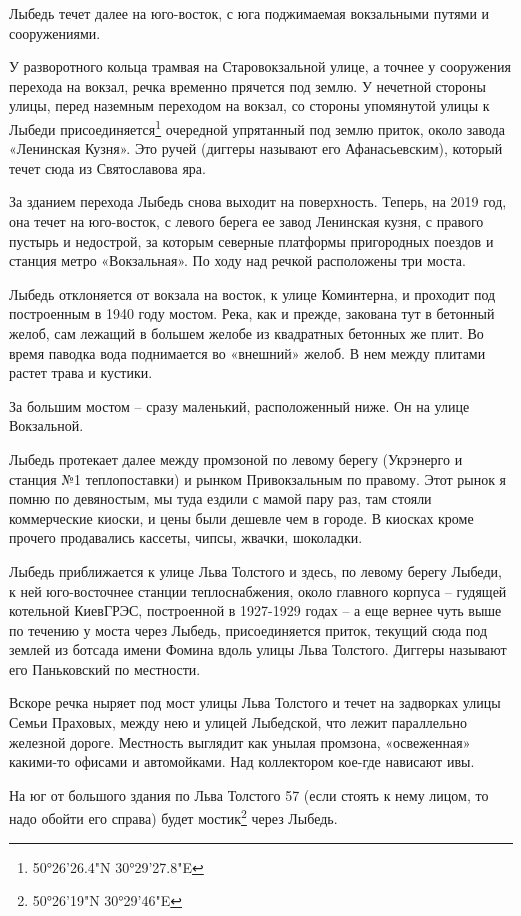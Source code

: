 Лыбедь течет далее на юго-восток, с юга поджимаемая вокзальными путями и сооружениями. 

У разворотного кольца трамвая на Старовокзальной улице, а точнее у сооружения перехода на вокзал, речка временно прячется под землю. У нечетной стороны улицы, перед наземным переходом на вокзал, со стороны упомянутой улицы к Лыбеди присоединяется\footnote{50°26'26.4"N 30°29'27.8"E} очередной упрятанный под землю приток, около завода «Ленинская Кузня». Это ручей (диггеры называют его Афанасьевским), который течет сюда из Святославова яра.

За зданием перехода Лыбедь снова выходит на поверхность. Теперь, на 2019 год, она течет на юго-восток, с левого берега ее завод Ленинская кузня, с правого пустырь и недострой, за которым северные платформы пригородных поездов и станция метро «Вокзальная». По ходу над речкой расположены три моста.

Лыбедь отклоняется от вокзала на восток, к улице Коминтерна, и проходит под построенным в 1940 году мостом. Река, как и прежде, закована тут в бетонный желоб, сам лежащий в большем желобе из квадратных бетонных же плит. Во время паводка вода поднимается во «внешний» желоб. В нем между плитами растет трава и кустики.

За большим мостом – сразу маленький, расположенный ниже. Он на улице Вокзальной.

Лыбедь протекает далее между промзоной по левому берегу (Укрэнерго и  станция №1 теплопоставки) и рынком Привокзальным по правому. Этот рынок я помню по девяностым, мы туда ездили с мамой пару раз, там стояли коммерческие киоски, и цены были дешевле чем в городе. В киосках кроме прочего продавались кассеты, чипсы, жвачки, шоколадки. 

Лыбедь приближается к улице Льва Толстого и здесь, по левому берегу Лыбеди, к ней юго-восточнее станции теплоснабжения, около главного корпуса – гудящей котельной КиевГРЭС, построенной в 1927-1929 годах – а еще вернее чуть выше по течению у моста через Лыбедь, присоединяется приток, текущий сюда под землей из ботсада имени Фомина вдоль улицы Льва Толстого. Диггеры называют его Паньковский по местности.

Вскоре речка ныряет под мост улицы Льва Толстого и течет на задворках улицы Семьи Праховых, между нею и улицей Лыбедской, что лежит параллельно железной дороге. Местность выглядит как унылая промзона, «освеженная» какими-то офисами и автомойками. Над коллектором кое-где нависают ивы.

На юг от большого здания по Льва Толстого 57 (если стоять к нему лицом, то надо обойти его справа) будет мостик\footnote{50°26'19"N   30°29'46"E} через Лыбедь.

